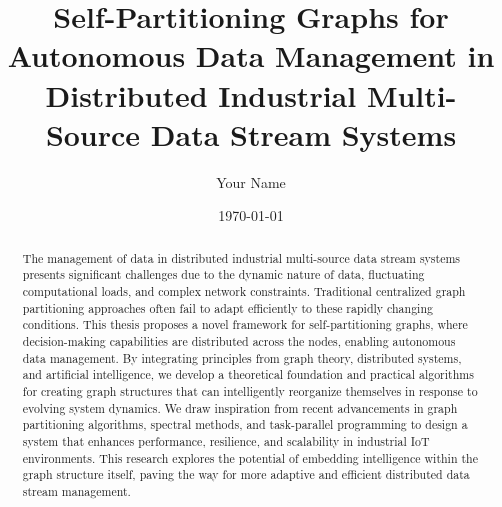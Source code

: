 \documentclass[12pt,a4paper]{report}
\title{Self-Partitioning Graphs for Autonomous Data Management in Distributed Industrial Multi-Source Data Stream Systems}
\author{Your Name}
\date{\today}
\begin{document}
\maketitle

\begin{abstract}
The management of data in distributed industrial multi-source data stream systems presents significant challenges due to the dynamic nature of data, fluctuating computational loads, and complex network constraints. Traditional centralized graph partitioning approaches often fail to adapt efficiently to these rapidly changing conditions. This thesis proposes a novel framework for self-partitioning graphs, where decision-making capabilities are distributed across the nodes, enabling autonomous data management. By integrating principles from graph theory, distributed systems, and artificial intelligence, we develop a theoretical foundation and practical algorithms for creating graph structures that can intelligently reorganize themselves in response to evolving system dynamics. We draw inspiration from recent advancements in graph partitioning algorithms, spectral methods, and task-parallel programming to design a system that enhances performance, resilience, and scalability in industrial IoT environments. This research explores the potential of embedding intelligence within the graph structure itself, paving the way for more adaptive and efficient distributed data stream management.
\end{abstract}

\tableofcontents
\listoffigures
\listoftables









\cleardoublepage
{}


\end{document}
